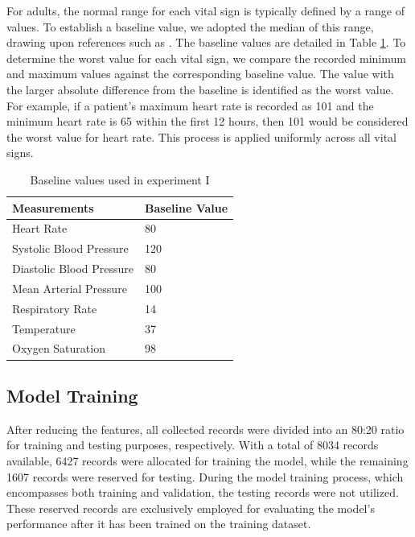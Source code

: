 \documentclass[12pt,a4paper,english
]{tunithesis}
\begin{document}
For adults, the normal range for each vital sign is typically defined by a range of values. To establish a baseline value, we adopted the median of this range, drawing upon references such as \textcite{medlineplus, johnsh, torp2023, yalemed}. The baseline values are detailed in Table \ref{table:baseline_value}. To determine the worst value for each vital sign, we compare the recorded minimum and maximum values against the corresponding baseline value. The value with the larger absolute difference from the baseline is identified as the worst value. For example, if a patient's maximum heart rate is recorded as 101 and the minimum heart rate is 65 within the first 12 hours, then 101 would be considered the worst value for heart rate. This process is applied uniformly across all vital signs.
 
\begin{table}[]
\centering
    \caption{Baseline values used in experiment I}
    \label{table:baseline_value}
    \begin{tabular}{|l|l|}
        \hline
        \textbf{Measurements} & \textbf{Baseline Value}\\ \hline
            Heart Rate& 80                \\ \hline
            Systolic Blood Pressure& 120               \\ \hline
            Diastolic Blood Pressure& 80                \\ \hline
            Mean Arterial Pressure& 100               \\ \hline
            Respiratory Rate& 14\\ \hline
            Temperature& 37\\ \hline
            Oxygen Saturation& 98                \\\hline
    \end{tabular}
\end{table}

\subsection{Model Training}

After reducing the features, all collected records were divided into an 80:20 ratio for training and testing purposes, respectively. With a total of 8034 records available, 6427 records were allocated for training the model, while the remaining 1607 records were reserved for testing. During the model training process, which encompasses both training and validation, the testing records were not utilized. These reserved records are exclusively employed for evaluating the model's performance after it has been trained on the training dataset. 
\end{document}
